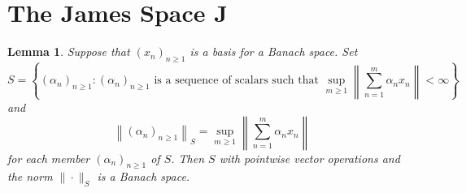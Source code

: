 \documentclass[11pt]{article}
\theoremstyle{thmstyle}
\newtheorem{lemma}[theorem]{Lemma}
\theoremstyle{defstyle}
\renewcommand{\ge}{\geqslant}
\newcommand{\bfJ}{\mathbf{J}}
\begin{document}
\section{The James Space \texorpdfstring{$\bfJ$}{J}}

\begin{lemma}
	Suppose that $(x_n)_{n\ge 1}$ is a basis for a Banach space. Set 
	\begin{equation*}
		S = \left\{(\alpha_n)_{n\ge 1}\colon (\alpha_n)_{n\ge 1}\text{ is a sequence of scalars such that }\sup_{m\ge 1}\left\|\sum_{n = 1}^m \alpha_n x_n\right\| < \infty\right\}
	\end{equation*}
	and 
	\begin{equation*}
		\left\|(\alpha_n)_{n\ge 1}\right\|_S = \sup_{m\ge 1}\left\|\sum_{n = 1}^m \alpha_n x_n\right\|
	\end{equation*}
	for each member $(\alpha_n)_{n\ge 1}$ of $S$. Then $S$ with pointwise vector operations and the norm $\|\cdot\|_S$ is a Banach space.
\end{lemma}
\end{document}

